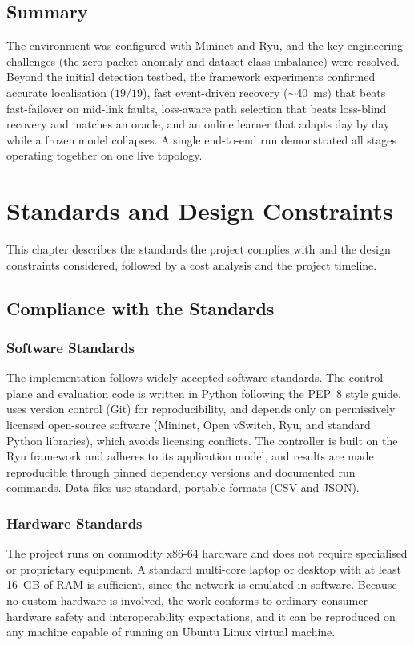 \documentclass[12pt,a4paper]{report}
\begin{document}
\section{Summary}
The environment was configured with Mininet and Ryu, and the key engineering challenges (the
zero-packet anomaly and dataset class imbalance) were resolved. Beyond the initial detection
testbed, the framework experiments confirmed accurate localisation ($19/19$), fast
event-driven recovery ($\sim$40~ms) that beats fast-failover on mid-link faults, loss-aware
path selection that beats loss-blind recovery and matches an oracle, and an online learner
that adapts day by day while a frozen model collapses. A single end-to-end run demonstrated
all stages operating together on one live topology.

\chapter{Standards and Design Constraints}
This chapter describes the standards the project complies with and the design constraints
considered, followed by a cost analysis and the project timeline.

\section{Compliance with the Standards}
\subsection{Software Standards}
The implementation follows widely accepted software standards. The control-plane and
evaluation code is written in Python following the PEP~8 style guide, uses version control
(Git) for reproducibility, and depends only on permissively licensed open-source software
(Mininet, Open vSwitch, Ryu, and standard Python libraries), which avoids licensing
conflicts. The controller is built on the Ryu framework and adheres to its application model,
and results are made reproducible through pinned dependency versions and documented run
commands. Data files use standard, portable formats (CSV and JSON).

\subsection{Hardware Standards}
The project runs on commodity x86-64 hardware and does not require specialised or proprietary
equipment. A standard multi-core laptop or desktop with at least 16~GB of RAM is sufficient,
since the network is emulated in software. Because no custom hardware is involved, the work
conforms to ordinary consumer-hardware safety and interoperability expectations, and it can
be reproduced on any machine capable of running an Ubuntu Linux virtual machine.
\end{document}
